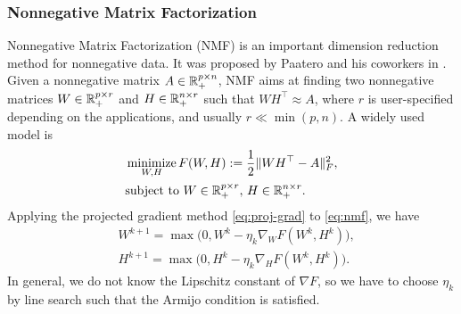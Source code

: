 \subsubsection{Nonnegative Matrix Factorization}
Nonnegative Matrix Factorization (NMF) is an important dimension reduction method for nonnegative data. It was proposed by Paatero and his coworkers in \cite{paatero1994NMF}. Given a nonnegative matrix $A\in\mathbb{R}^{p\times n}_+$, NMF aims at finding two nonnegative matrices $W\in\mathbb{R}^{p\times r}_+$ and $H\in\mathbb{R}^{n\times r}_+$ such that $WH^\top\approx A$, where $r$ is user-specified depending on the applications, and usually $r\ll \min(p,n)$. A widely used model is
\begin{equation}\label{eq:nmf}
\begin{aligned}
&\Min_{W,H}F(W,H):=\frac{1}{2}\|WH^\top-A\|_F^2, \\
& \St\ W\in\RR^{p\times r}_+,\, H\in \RR^{n\times r}_+. 
\end{aligned}
\end{equation}
Applying the projected gradient method \eqref{eq:proj-grad} to \eqref{eq:nmf}, we have
\begin{subequations}\label{pg-nmf}
\begin{align}
&W^{k+1}=\max\big(0, W^k-\eta_k \nabla_W F(W^k, H^k)\big),\\
&H^{k+1}=\max\big(0,H^k-\eta_k \nabla_H F(W^k, H^k) \big).
\end{align}
\end{subequations}
In general, we do not know the Lipschitz constant of $\nabla F$, so we have to choose $\eta_k$ by line search such that the Armijo condition is satisfied.

